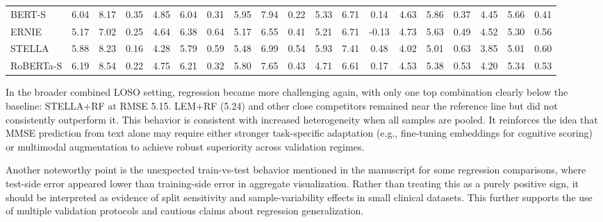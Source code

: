 \documentclass[final,5p,times]{elsarticle}
\begin{document}
\begin{table}[t]
\begin{threeparttable}
\begin{adjustbox}{max width=\textwidth}
\begin{tabular}{lcccccccccccccccccc}
BERT-S    & 6.04 & 8.17 & 0.35 & 4.85 & 6.04 & 0.31 & 5.95 & 7.94 & 0.22 & 5.33 & 6.71 & 0.14 & 4.63 & 5.86 & 0.37 & 4.45 & 5.66 & 0.41 \\
ERNIE     & 5.17 & 7.02 & 0.25 & 4.64 & 6.38 & 0.64 & 5.17 & 6.55 & 0.41 & 5.21 & 6.71 & -0.13 & 4.73 & 5.63 & 0.49 & 4.52 & 5.30 & 0.56 \\
STELLA    & 5.88 & 8.23 & 0.16 & 4.28 & 5.79 & 0.59 & 5.48 & 6.99 & 0.54 & 5.93 & 7.41 & 0.48 & 4.02 & 5.01 & 0.63 & 3.85 & 5.01 & 0.60 \\
RoBERTa-S & 6.19 & 8.54 & 0.22 & 4.75 & 6.21 & 0.32 & 5.80 & 7.65 & 0.43 & 4.71 & 6.61 & 0.17 & 4.53 & 5.38 & 0.53 & 4.20 & 5.34 & 0.53 \\
\bottomrule
\end{tabular}
\end{adjustbox}
\end{threeparttable}
\end{table}


In the broader combined LOSO setting, regression became more challenging again, with only one top combination clearly below the baseline: STELLA+RF at RMSE 5.15. LEM+RF (5.24) and other close competitors remained near the reference line but did not consistently outperform it. This behavior is consistent with increased heterogeneity when all samples are pooled. It reinforces the idea that MMSE prediction from text alone may require either stronger task-specific adaptation (e.g., fine-tuning embeddings for cognitive scoring) or multimodal augmentation to achieve robust superiority across validation regimes.

Another noteworthy point is the unexpected train-vs-test behavior mentioned in the manuscript for some regression comparisons, where test-side error appeared lower than training-side error in aggregate visualization. Rather than treating this as a purely positive sign, it should be interpreted as evidence of split sensitivity and sample-variability effects in small clinical datasets. This further supports the use of multiple validation protocols and cautious claims about regression generalization.
\end{document}
